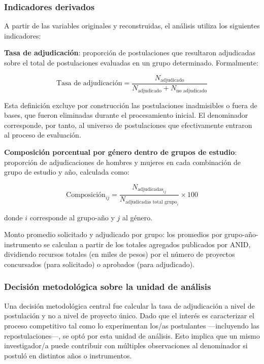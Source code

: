 \documentclass[
  12pt,
  letterpaper,
]{article}
\begin{document}
\endgroup{}

\subsubsection{Indicadores derivados}\label{indicadores-derivados}

A partir de las variables originales y reconstruidas, el análisis
utiliza los siguientes indicadores:

\textbf{Tasa de adjudicación}: proporción de postulaciones que
resultaron adjudicadas sobre el total de postulaciones evaluadas en un
grupo determinado. Formalmente:

\[\text{Tasa de adjudicación} = \frac{N_{\text{adjudicado}}}{N_{\text{adjudicado}} + N_{\text{no adjudicado}}}\]

Esta definición excluye por construcción las postulaciones inadmisibles
o fuera de bases, que fueron eliminadas durante el procesamiento
inicial. El denominador corresponde, por tanto, al universo de
postulaciones que efectivamente entraron al proceso de evaluación.

\textbf{Composición porcentual por género dentro de grupos de estudio}:
proporción de adjudicaciones de hombres y mujeres en cada combinación de
grupo de estudio y año, calculada como:

\[\text{Composición}_{ij} = \frac{N_{\text{adjudicadas}_{ij}}}{N_{\text{adjudicadas total grupo}_{i}}} \times 100\]

donde \(i\) corresponde al grupo-año y \(j\) al género.

Monto promedio solicitado y adjudicado por grupo: los promedios por
grupo-año-instrumento se calculan a partir de los totales agregados
publicados por ANID, dividiendo recursos totales (en miles de pesos) por
el número de proyectos concursados (para solicitado) o aprobados (para
adjudicado).

\subsubsection{Decisión metodológica sobre la unidad de
análisis}\label{decisiuxf3n-metodoluxf3gica-sobre-la-unidad-de-anuxe1lisis}

Una decisión metodológica central fue calcular la tasa de adjudicación a
nivel de postulación y no a nivel de proyecto único. Dado que el interés
es caracterizar el proceso competitivo tal como lo experimentan los/as
postulantes ---incluyendo las repostulaciones---, se optó por esta
unidad de análisis. Esto implica que un mismo investigador/a puede
contribuir con múltiples observaciones al denominador si postuló en
distintos años o instrumentos.
\end{document}
